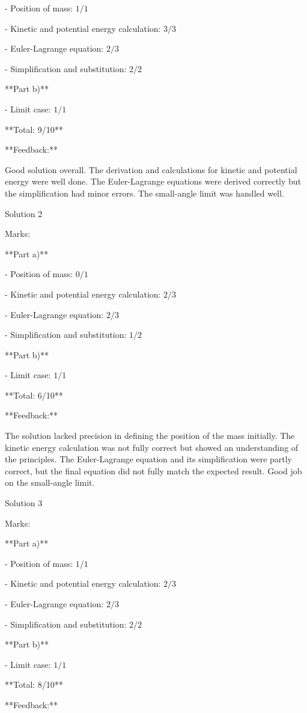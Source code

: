 \documentclass[a4paper,11pt]{article}
\begin{document}
- Position of mass: \(1/1\)

- Kinetic and potential energy calculation: \(3/3\)

- Euler-Lagrange equation: \(2/3\)

- Simplification and substitution: \(2/2\)

**Part b)**

- Limit case: \(1/1\)

**Total: 9/10**

**Feedback:**

Good solution overall. The derivation and calculations for kinetic and potential energy were well done. The Euler-Lagrange equations were derived correctly but the simplification had minor errors. The small-angle limit was handled well.

Solution 2

Marks:

**Part a)**

- Position of mass: \(0/1\)

- Kinetic and potential energy calculation: \(2/3\)

- Euler-Lagrange equation: \(2/3\)

- Simplification and substitution: \(1/2\)

**Part b)**

- Limit case: \(1/1\)

**Total: 6/10**

**Feedback:**

The solution lacked precision in defining the position of the mass initially. The kinetic energy calculation was not fully correct but showed an understanding of the principles. The Euler-Lagrange equation and its simplification were partly correct, but the final equation did not fully match the expected result. Good job on the small-angle limit.

Solution 3

Marks:

**Part a)**

- Position of mass: \(1/1\)

- Kinetic and potential energy calculation: \(2/3\)

- Euler-Lagrange equation: \(2/3\)

- Simplification and substitution: \(2/2\)

**Part b)**

- Limit case: \(1/1\)

**Total: 8/10**

**Feedback:**
\end{document}
